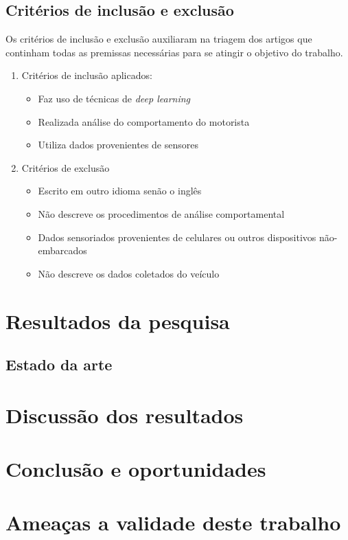\documentclass[10pt,journal,compsoc]{IEEEtran}
\begin{document}
\subsection{Critérios de inclusão e exclusão}
\label{sec:protocolo:inclusao}
Os critérios de inclusão e exclusão auxiliaram na triagem dos artigos
que continham todas as premissas necessárias para se atingir o
objetivo do trabalho.

\begin{enumerate}
\item Critérios de inclusão aplicados:
\begin{itemize}
\item Faz uso de técnicas de \textit{deep learning}
\item Realizada análise do comportamento do motorista
\item Utiliza dados provenientes de sensores
\end{itemize}
  \item Critérios de exclusão
\begin{itemize}
\item Escrito em outro idioma senão o inglês
\item Não descreve os procedimentos de análise comportamental
\item Dados sensoriados provenientes de celulares ou outros
  dispositivos não-embarcados
\item Não descreve os dados coletados do veículo
\end{itemize}
\end{enumerate}

\section{Resultados da pesquisa}
\label{sec:resultados}
\subsection{Estado da arte}


\section{Discussão dos resultados}
\label{sec:discussao}

\section{Conclusão e oportunidades}
\label{sec:conclusao}

\section{Ameaças a validade deste trabalho}
\label{sec:validade}
\end{document}
